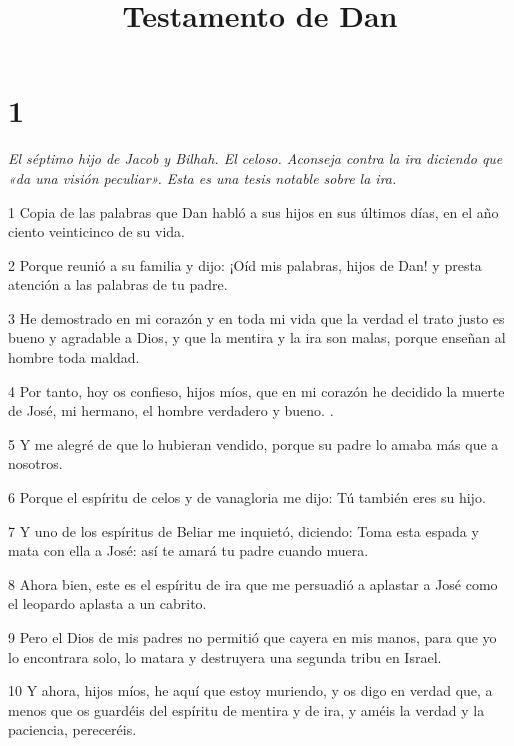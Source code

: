

\title{Testamento de Dan}

\chapter{1}

\par \textit{El séptimo hijo de Jacob y Bilhah. El celoso. Aconseja contra la ira diciendo que «da una visión peculiar». Esta es una tesis notable sobre la ira.}

\par 1 Copia de las palabras que Dan habló a sus hijos en sus últimos días, en el año ciento veinticinco de su vida.

\par 2 Porque reunió a su familia y dijo: ¡Oíd mis palabras, hijos de Dan! y presta atención a las palabras de tu padre.

\par 3 He demostrado en mi corazón y en toda mi vida que la verdad el trato justo es bueno y agradable a Dios, y que la mentira y la ira son malas, porque enseñan al hombre toda maldad.

\par 4 Por tanto, hoy os confieso, hijos míos, que en mi corazón he decidido la muerte de José, mi hermano, el hombre verdadero y bueno. .

\par 5 Y me alegré de que lo hubieran vendido, porque su padre lo amaba más que a nosotros.

\par 6 Porque el espíritu de celos y de vanagloria me dijo: Tú también eres su hijo.

\par 7 Y uno de los espíritus de Beliar me inquietó, diciendo: Toma esta espada y mata con ella a José: así te amará tu padre cuando muera.

\par 8 Ahora bien, este es el espíritu de ira que me persuadió a aplastar a José como el leopardo aplasta a un cabrito.

\par 9 Pero el Dios de mis padres no permitió que cayera en mis manos, para que yo lo encontrara solo, lo matara y destruyera una segunda tribu en Israel.

\par 10 Y ahora, hijos míos, he aquí que estoy muriendo, y os digo en verdad que, a menos que os guardéis del espíritu de mentira y de ira, y améis la verdad y la paciencia, pereceréis.

